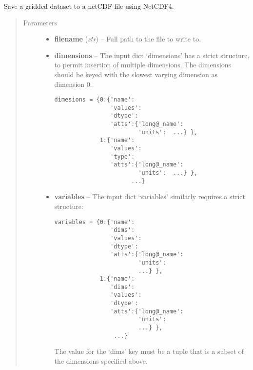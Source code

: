 \documentclass[letterpaper,10pt,english]{sphinxmanual}
\begin{document}
\begin{fulllineitems}
\label{docs/utilities:nctools.nc_save_grid}
Save a gridded dataset to a netCDF file using NetCDF4.
\begin{quote}\begin{description}
\item[{Parameters}] \leavevmode\begin{itemize}
\item {} 
\textbf{filename} (\emph{str}) -- Full path to the file to write to.

\item {} 
\textbf{dimensions} -- 
The input dict `dimensions' has a strict structure, to
permit insertion of multiple dimensions. The dimensions should be keyed
with the slowest varying dimension as dimension 0.

\begin{Verbatim}[commandchars=@\[\]]
dimesions = {0:{'name':
                'values':
                'dtype':
                'atts':{'long@_name':
                        'units':  ...} },
             1:{'name':
                'values':
                'type':
                'atts':{'long@_name':
                        'units':  ...} },
                      ...}
\end{Verbatim}


\item {} 
\textbf{variables} -- 
The input dict `variables' similarly requires a strict structure:

\begin{Verbatim}[commandchars=@\[\]]
variables = {0:{'name':
                'dims':
                'values':
                'dtype':
                'atts':{'long@_name':
                        'units':
                        ...} },
             1:{'name':
                'dims':
                'values':
                'dtype':
                'atts':{'long@_name':
                        'units':
                        ...} },
                 ...}
\end{Verbatim}

The value for the `dims' key must be a tuple that is a subset of
the dimensions specified above.



\end{itemize}
\end{description}
\end{quote}
\end{fulllineitems}
\end{document}
